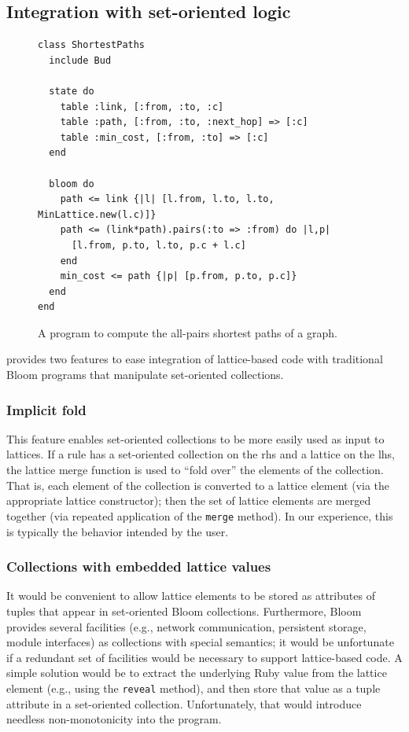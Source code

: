 \subsection{Integration with set-oriented logic}
\label{sec:bloom-interop}

\begin{figure}[t]
\begin{scriptsize}
\begin{lstlisting}
class ShortestPaths
  include Bud

  state do
    table :link, [:from, :to, :c]
    table :path, [:from, :to, :next_hop] => [:c]
    table :min_cost, [:from, :to] => [:c]
  end

  bloom do
    path <= link {|l| [l.from, l.to, l.to, MinLattice.new(l.c)]}
    path <= (link*path).pairs(:to => :from) do |l,p|
      [l.from, p.to, l.to, p.c + l.c]
    end
    min_cost <= path {|p| [p.from, p.to, p.c]}
  end
end
\end{lstlisting}
\end{scriptsize}
\caption{A \lang program to compute the all-pairs shortest paths of a
  graph.}
\label{fig:lattice-spaths}
\end{figure}

\lang provides two features to ease integration of lattice-based code with
traditional Bloom programs that manipulate set-oriented collections.

\subsubsection{Implicit fold}
This feature enables set-oriented collections to be more easily used as input to
lattices. If a \lang rule has a set-oriented collection on the rhs and a lattice
on the lhs, the lattice merge function is used to ``fold over'' the elements of
the collection. That is, each element of the collection is converted to a
lattice element (via the appropriate lattice constructor); then the set of
lattice elements are merged together (via repeated application of the
\texttt{merge} method). In our experience, this is typically the behavior
intended by the user.

\subsubsection{Collections with embedded lattice values}
It would be convenient to allow lattice elements to be stored as attributes of
tuples that appear in set-oriented Bloom collections. Furthermore, Bloom
provides several facilities (e.g., network communication, persistent storage,
module interfaces) as collections with special semantics; it would be
unfortunate if a redundant set of facilities would be necessary to support
lattice-based code. A simple solution would be to extract the underlying Ruby
value from the lattice element (e.g., using the \texttt{reveal} method), and
then store that value as a tuple attribute in a set-oriented
collection. Unfortunately, that would introduce needless non-monotonicity into
the program.

